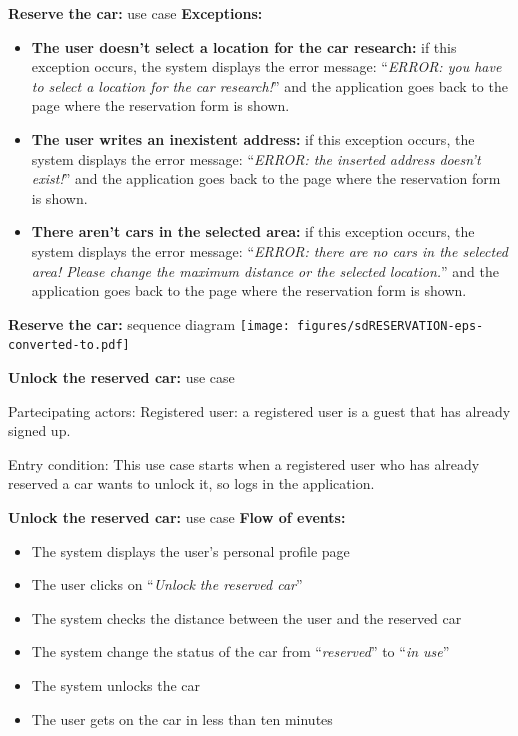\documentclass{beamer}
\begin{document}
	\begin{frame}{\textbf{Reserve the car:} use case}
		\textbf{Exceptions:}\\
		\begin{itemize}
			\item \textbf{The user doesn't select a location for the car research:} if this exception occurs, the system displays the error message: ``\textit{ERROR: you have to select a location for the car research!}'' and the application goes back to the page where the reservation form is shown.
			\item \textbf{The user writes an inexistent address:} if this exception occurs, the system displays the error message: ``\textit{ERROR: the inserted address doesn't exist!}'' and the application goes back to the page where the reservation form is shown.
			\item \textbf{There aren't cars in the selected area:} if this exception occurs, the system displays the error message: ``\textit{ERROR: there are no cars in the selected area! Please change the maximum distance or the selected location.}'' and the application goes back to the page where the reservation form is shown.
		\end{itemize}
	\end{frame}

	\begin{frame}{\textbf{Reserve the car:} sequence diagram}
		\texttt{[image: figures/sdRESERVATION-eps-converted-to.pdf]}
	\end{frame}

	\begin{frame}{\textbf{Unlock the reserved car:} use case}
		\begin{block}{Partecipating actors:}
			Registered user: a registered user is a guest that has already signed up.
		\end{block}
		\begin{block}{Entry condition:}
			This use case starts when a registered user who has already reserved a car wants to unlock it, so logs in the application.
		\end{block}
	\end{frame}
	
	\begin{frame} {\textbf{Unlock the reserved car:} use case}
		\textbf{Flow of events:}\\
		\begin{itemize} 
			\item The system displays the user's personal profile page
			\item The user clicks on ``\textit{Unlock the reserved car}''
			\item The system checks the distance between the user and the reserved car
			\item The system change the status of the car from ``\textit{reserved}'' to ``\textit{in use}''
			\item The system unlocks the car
			\item The user gets on the car in less than ten minutes
		\end{itemize}
	\end{frame}
	
\end{document}
